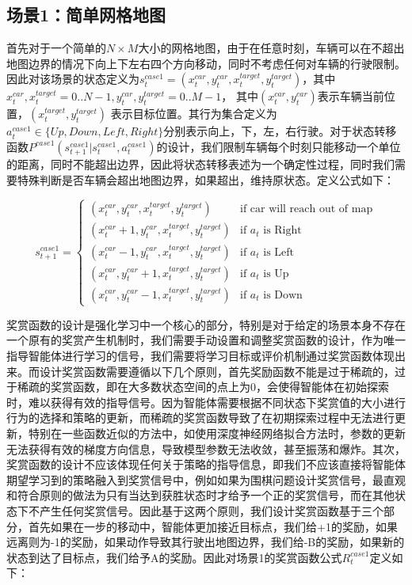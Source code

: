 \documentclass{standalone}
\begin{document}
\subsection{场景1：简单网格地图}
首先对于一个简单的$N \times M$大小的网格地图，由于在任意时刻，车辆可以在不超出地图边界的情况下向上下左右四个方向移动，同时不考虑任何对车辆的行驶限制。因此对该场景的状态定义为$s_t^{case1} = (x_t^{car}, y_t^{car}, x^{target}_t, y^{target}_t)$，其中 $x_t^{car}, x^{target}_t=0..N-1, y_t^{car}, y^{target}_t=0..M-1$， 其中$(x_t^{car}, y_t^{car})$表示车辆当前位置，$(x^{target}_t, y^{target}_t)$ 表示目标位置。其行为集合定义为$a_t^{case1} \in \{Up, Down, Left, Right\}$分别表示向上，下，左，右行驶。对于状态转移函数$P^{case1}{(s_{t+1}^{case1}|s_t^{case1}, a_t^{case1})}$的设计，我们限制车辆每个时刻只能移动一个单位的距离，同时不能超出边界，因此将状态转移表述为一个确定性过程，同时我们需要特殊判断是否车辆会超出地图边界，如果超出，维持原状态。定义公式如下：
\begin{center}
    \begin{equation}
    s_{t+1}^{case1} = \begin{cases}
    (x_t^{car}, y_t^{car}, x^{target}_t, y^{target}_t) &\mbox{if car will reach out of map}\\
    (x_t^{car} + 1, y_t^{car}, x^{target}_t, y^{target}_t) &\mbox{if $a_t$ is Right}\\
    (x_t^{car} - 1, y_t^{car}, x^{target}_t, y^{target}_t) &\mbox{if $a_t$ is Left}\\
    (x_t^{car}, y_t^{car} + 1, x^{target}_t, y^{target}_t) &\mbox{if $a_t$ is Up}\\
    (x_t^{car}, y_t^{car} - 1, x^{target}_t, y^{target}_t) &\mbox{if $a_t$ is Down}
    \end{cases}
\end{equation}
\end{center}
奖赏函数的设计是强化学习中一个核心的部分，特别是对于给定的场景本身不存在一个原有的奖赏产生机制时，我们需要手动设置和调整奖赏函数的设计，作为唯一指导智能体进行学习的信号，我们需要将学习目标或评价机制通过奖赏函数体现出来。而设计奖赏函数需要遵循以下几个原则，首先奖励函数不能是过于稀疏的，过于稀疏的奖赏函数，即在大多数状态空间的点上为0，会使得智能体在初始探索时，难以获得有效的指导信号。因为智能体需要根据不同状态下奖赏值的大小进行行为的选择和策略的更新，而稀疏的奖赏函数导致了在初期探索过程中无法进行更新，特别在一些函数近似的方法中，如使用深度神经网络拟合方法时，参数的更新无法获得有效的梯度方向信息，导致模型参数无法收敛，甚至振荡和爆炸。其次，奖赏函数的设计不应该体现任何关于策略的指导信息，即我们不应该直接将智能体期望学习到的策略融入到奖赏信号中，例如如果为围棋问题设计奖赏信号，最直观和符合原则的做法为只有当达到获胜状态时才给予一个正的奖赏信号，而在其他状态下不产生任何奖赏信号。因此基于这两个原则，我们设计奖赏函数基于三个部分，首先如果在一步的移动中，智能体更加接近目标点，我们给+1的奖励，如果远离则为-1的奖励，如果动作导致其行驶出地图边界，我们给-B的奖励，如果新的状态到达了目标点，我们给予A的奖励。因此对场景1的奖赏函数公式$R_t^{case1}$定义如下：
\end{document}
